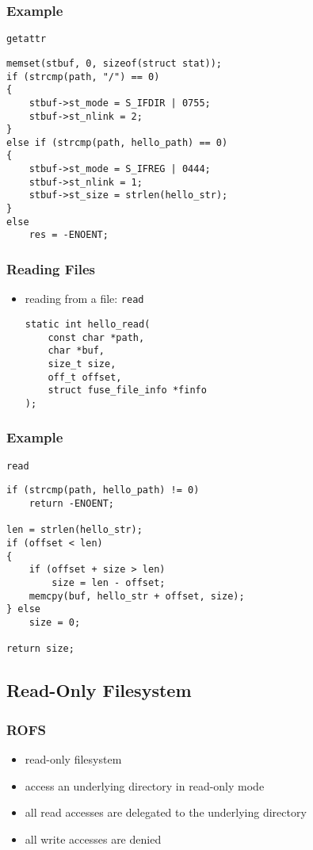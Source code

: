 \documentclass[dvipsnames]{beamer}
\begin{document}
\begin{frame}[fragile]
  \frametitle{Example}

  \begin{exampleblock}{\lstinline|getattr|}
    \begin{lstlisting}
memset(stbuf, 0, sizeof(struct stat));
if (strcmp(path, "/") == 0)
{
    stbuf->st_mode = S_IFDIR | 0755;
    stbuf->st_nlink = 2;
}
else if (strcmp(path, hello_path) == 0)
{
    stbuf->st_mode = S_IFREG | 0444;
    stbuf->st_nlink = 1;
    stbuf->st_size = strlen(hello_str);
}
else
    res = -ENOENT;
    \end{lstlisting}
  \end{exampleblock}
\end{frame}

\begin{frame}[fragile]
  \frametitle{Reading Files}

  \begin{itemize}
    \item reading from a file: \lstinline|read|
    \begin{lstlisting}[style=syntax]
static int hello_read(
    const char *path,
    char *buf,
    size_t size,
    off_t offset,
    struct fuse_file_info *finfo
);
    \end{lstlisting}
  \end{itemize}
\end{frame}

\begin{frame}[fragile]
  \frametitle{Example}

  \begin{exampleblock}{\lstinline|read|}
    \begin{lstlisting}
if (strcmp(path, hello_path) != 0)
    return -ENOENT;

len = strlen(hello_str);
if (offset < len)
{
    if (offset + size > len)
        size = len - offset;
    memcpy(buf, hello_str + offset, size);
} else
    size = 0;

return size;
    \end{lstlisting}
  \end{exampleblock}
\end{frame}

\subsection{Read-Only Filesystem}

\begin{frame}
  \frametitle{ROFS}

  \begin{itemize}
    \item read-only filesystem
    \item access an underlying directory in read-only mode
    \item all read accesses are delegated to the underlying directory
    \item all write accesses are denied
  \end{itemize}
\end{frame}
\end{document}
